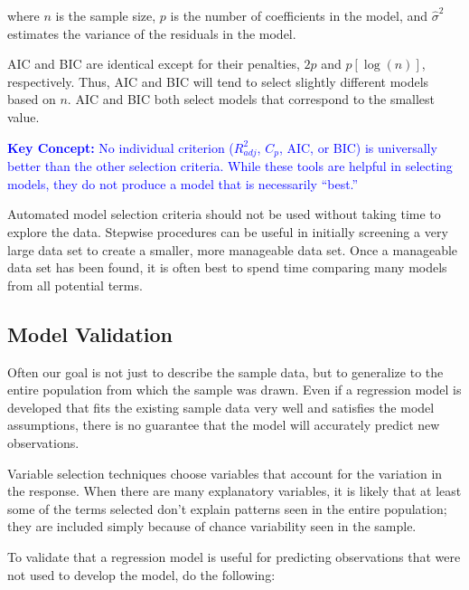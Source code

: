 \documentclass[
]{report}
\begin{document}
where \(\scriptstyle n\) is the sample size, \(\scriptstyle p\) is the number of coefficients in the model, and \(\scriptstyle \hat{\sigma}^2\) estimates the variance of the residuals in the model.

AIC and BIC are identical except for their penalties, \(\scriptstyle 2p\) and \(\scriptstyle p[\log(n)]\), respectively. Thus, AIC and BIC will tend to select slightly different models based on \(\scriptstyle n\). AIC and BIC both select models that correspond to the smallest value.

\textbf{\textcolor{blue}{Key Concept:}}
\textcolor{blue}{No individual criterion ($\scriptstyle R^2_{adj}$, $\scriptstyle C_p$, AIC, or BIC) is universally better than the other selection criteria. While these tools are helpful in selecting models, they do not produce a model that is necessarily “best.”}

Automated model selection criteria should not be used without taking time to explore the data. Stepwise procedures can be useful in initially screening a very large data set to create a smaller, more manageable data set. Once a manageable data set has been found, it is often best to spend time comparing many models from all potential terms.

\hypertarget{model-validation}{%
\subsection*{Model Validation}\label{model-validation}}

Often our goal is not just to describe the sample data, but to generalize to the entire population from which the sample was drawn. Even if a regression model is developed that fits the existing sample data very well and satisfies the model assumptions, there is no guarantee that the model will accurately predict new observations.

Variable selection techniques choose variables that account for the variation in the response. When there are many explanatory variables, it is likely that at least some of the terms selected don't explain patterns seen in the entire population; they are included simply because of chance variability seen in the sample.

To validate that a regression model is useful for predicting observations that were not used to develop
the model, do the following:
\end{document}
